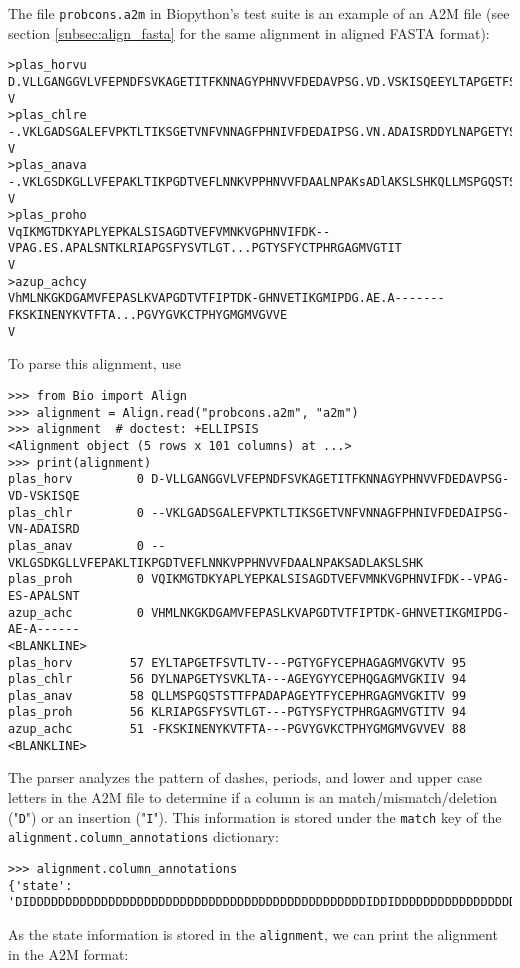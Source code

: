 The file \verb+probcons.a2m+ in Biopython's test suite is an example of an A2M file (see section \ref{subsec:align_fasta} for the same alignment in aligned FASTA format):
\begin{verbatim}
>plas_horvu
D.VLLGANGGVLVFEPNDFSVKAGETITFKNNAGYPHNVVFDEDAVPSG.VD.VSKISQEEYLTAPGETFSVTLTV...PGTYGFYCEPHAGAGMVGKVT
V
>plas_chlre
-.VKLGADSGALEFVPKTLTIKSGETVNFVNNAGFPHNIVFDEDAIPSG.VN.ADAISRDDYLNAPGETYSVKLTA...AGEYGYYCEPHQGAGMVGKII
V
>plas_anava
-.VKLGSDKGLLVFEPAKLTIKPGDTVEFLNNKVPPHNVVFDAALNPAKsADlAKSLSHKQLLMSPGQSTSTTFPAdapAGEYTFYCEPHRGAGMVGKIT
V
>plas_proho
VqIKMGTDKYAPLYEPKALSISAGDTVEFVMNKVGPHNVIFDK--VPAG.ES.APALSNTKLRIAPGSFYSVTLGT...PGTYSFYCTPHRGAGMVGTIT
V
>azup_achcy
VhMLNKGKDGAMVFEPASLKVAPGDTVTFIPTDK-GHNVETIKGMIPDG.AE.A-------FKSKINENYKVTFTA...PGVYGVKCTPHYGMGMVGVVE
V
\end{verbatim}
To parse this alignment, use
\begin{verbatim}
>>> from Bio import Align
>>> alignment = Align.read("probcons.a2m", "a2m")
>>> alignment  # doctest: +ELLIPSIS
<Alignment object (5 rows x 101 columns) at ...>
>>> print(alignment)
plas_horv         0 D-VLLGANGGVLVFEPNDFSVKAGETITFKNNAGYPHNVVFDEDAVPSG-VD-VSKISQE
plas_chlr         0 --VKLGADSGALEFVPKTLTIKSGETVNFVNNAGFPHNIVFDEDAIPSG-VN-ADAISRD
plas_anav         0 --VKLGSDKGLLVFEPAKLTIKPGDTVEFLNNKVPPHNVVFDAALNPAKSADLAKSLSHK
plas_proh         0 VQIKMGTDKYAPLYEPKALSISAGDTVEFVMNKVGPHNVIFDK--VPAG-ES-APALSNT
azup_achc         0 VHMLNKGKDGAMVFEPASLKVAPGDTVTFIPTDK-GHNVETIKGMIPDG-AE-A------
<BLANKLINE>
plas_horv        57 EYLTAPGETFSVTLTV---PGTYGFYCEPHAGAGMVGKVTV 95
plas_chlr        56 DYLNAPGETYSVKLTA---AGEYGYYCEPHQGAGMVGKIIV 94
plas_anav        58 QLLMSPGQSTSTTFPADAPAGEYTFYCEPHRGAGMVGKITV 99
plas_proh        56 KLRIAPGSFYSVTLGT---PGTYSFYCTPHRGAGMVGTITV 94
azup_achc        51 -FKSKINENYKVTFTA---PGVYGVKCTPHYGMGMVGVVEV 88
<BLANKLINE>
\end{verbatim}
The parser analyzes the pattern of dashes, periods, and lower and upper case letters in the A2M file to determine if a column is an match/mismatch/deletion ("\verb|D|") or an insertion ("\verb|I|"). This information is stored under the \verb+match+ key of the \verb+alignment.column_annotations+ dictionary:
\begin{verbatim}
>>> alignment.column_annotations
{'state': 'DIDDDDDDDDDDDDDDDDDDDDDDDDDDDDDDDDDDDDDDDDDDDDDDDIDDIDDDDDDDDDDDDDDDDDDDDDDDIIIDDDDDDDDDDDDDDDDDDDDDD'}
\end{verbatim}
As the state information is stored in the \verb+alignment+, we can print the alignment in the A2M format:
